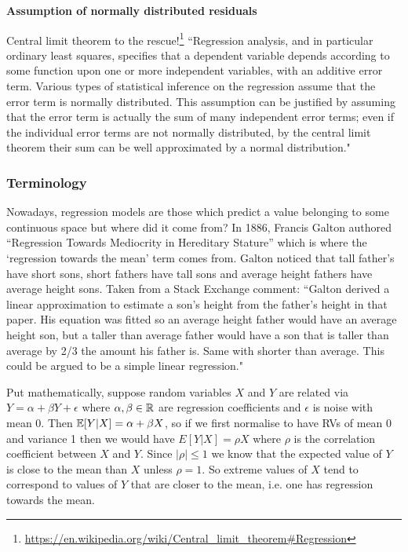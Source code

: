 \documentclass[11pt]{article}
\begin{document}
\begin{tcolorbox}[colback=c2]
    \textbf{Assumption of normally distributed residuals}
    \vspace{10pt}

    Central limit theorem to the rescue!\footnote{\url{https://en.wikipedia.org/wiki/Central\_limit\_theorem\#Regression}} ``Regression analysis, and in particular ordinary least squares, specifies that a dependent variable depends according to some function upon one or more independent variables, with an additive error term. Various types of statistical inference on the regression assume that the error term is normally distributed. This assumption can be justified by assuming that the error term is actually the sum of many independent error terms; even if the individual error terms are not normally distributed, by the central limit theorem their sum can be well approximated by a normal distribution."
\end{tcolorbox}

\subsubsection{Terminology}

Nowadays, regression models are those which predict a value belonging to some continuous space but where did it come from? In 1886, Francis Galton authored ``Regression Towards Mediocrity in Hereditary Stature'' which is where the `regression towards the mean' term comes from. Galton noticed that tall father's have short sons, short fathers have tall sons and average height fathers have average height sons. Taken from a Stack Exchange comment: ``Galton derived a linear approximation to estimate a son's height from the father's height in that paper. His equation was fitted so an average height father would have an average height son, but a taller than average father would have a son that is taller than average by 2/3 the amount his father is. Same with shorter than average. This could be argued to be a simple linear regression."

Put mathematically, suppose random variables $X$ and $Y$ are related via $Y=\alpha+\beta Y+\epsilon$ where $\alpha,\beta\in\mathbb{R}$ are regression coefficients and $\epsilon$ is noise with mean $0$. Then $\mathbb{E}[Y|X]=\alpha+\beta X$, so if we first normalise to have RVs of mean 0 and variance 1 then we would have $E[Y|X]=\rho X$ where $\rho$ is the correlation coefficient between $X$ and $Y$. Since $|\rho|\leq1$ we know that the expected value of $Y$ is close to the mean than $X$ unless $\rho=1$. So extreme values of $X$ tend to correspond to values of $Y$ that are closer to the mean, i.e. one has regression towards the mean.
\end{document}
